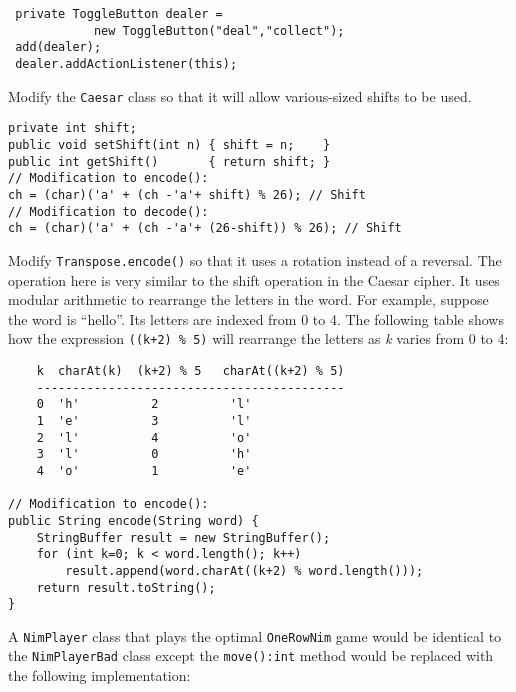 \begin{ANS}
\begin{jjjlisting}
\begin{lstlisting}
 private ToggleButton dealer = 
            new ToggleButton("deal","collect");
 add(dealer);
 dealer.addActionListener(this);
\end{lstlisting}
\end{jjjlisting}



\item  Modify the {\tt Caesar} class so that it will allow various-sized
shifts to be used.

\begin{jjjlisting}
\begin{lstlisting}
private int shift;                               
public void setShift(int n) { shift = n;    }
public int getShift()       { return shift; }
// Modification to encode():
ch = (char)('a' + (ch -'a'+ shift) % 26); // Shift
// Modification to decode():
ch = (char)('a' + (ch -'a'+ (26-shift)) % 26); // Shift
\end{lstlisting}
\end{jjjlisting}


\item  Modify {\tt Transpose.encode()} so that it uses a rotation instead of
a reversal.  The operation here is very similar to the shift operation
in the Caesar cipher.  It uses modular arithmetic to rearrange the letters
in the word. For example, suppose the word is ``hello''.  Its letters are
indexed from 0 to 4. The following table shows how the expression \verb|((k+2) % 5)|
will rearrange the letters as {\it k} varies from 0 to 4:

\begin{jjjlisting}
\begin{lstlisting}
    k  charAt(k)  (k+2) % 5   charAt((k+2) % 5)
    -------------------------------------------
    0  'h'          2          'l'
    1  'e'          3          'l'
    2  'l'          4          'o'
    3  'l'          0          'h'
    4  'o'          1          'e'

// Modification to encode():
public String encode(String word) {
    StringBuffer result = new StringBuffer();
    for (int k=0; k < word.length(); k++)
        result.append(word.charAt((k+2) % word.length()));
    return result.toString();
}
\end{lstlisting}
\end{jjjlisting}

\item A {\tt NimPlayer} class that plays the optimal {\tt OneRowNim} game would
be identical to the {\tt NimPlayerBad} class except the {\tt move():int} method
would be replaced with the following implementation:


\end{ANS}
